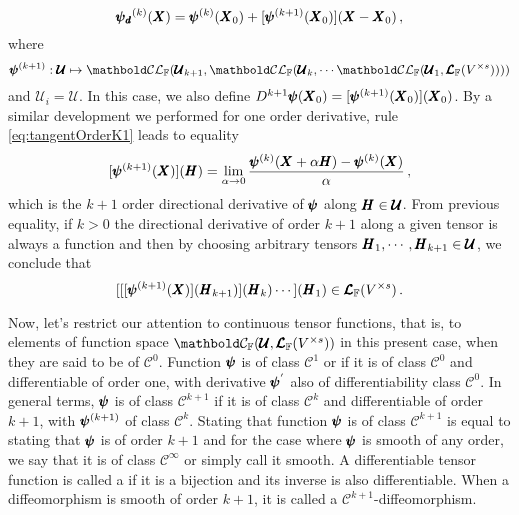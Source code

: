 \begin{equation}\label{eq:tangentOrderK1}
\pmb{\psi_\mathit{d}}^{(k)}(\pmb{X})=\pmb{\psi}^{(k)}(\pmb{X}_0)+[\pmb{\psi}^{(k+1)}(\pmb{X}_0)](\pmb{X}-\pmb{X}_0)\,,
\end{equation}
where
\begin{equation*}
\map{\tnr{\psi}^{(k+1)}}{\pmb{\mathcal{U}}}{{\evlc{\cam{F}}{\pmb{\mathcal{U}}_{k+1}}{\evlc{\cam{F}}{\pmb{\mathcal{U}}_k}{\cdots\evlc{\cam{F}}{\pmb{\mathcal{U}}_{1}}{\ete{\cam{F}}{V^{\times s}}}}}}}
\end{equation*}
and $\pmb{\mathcal{U}}_i=\pmb{\mathcal{U}}$. In this case, we also define $D^{k+1}\pmb{\psi}(\pmb{X}_0)=[\pmb{\psi}^{(k+1)}(\pmb{X}_0)](\pmb{X}_0)$. By a similar development we performed for one order derivative, rule \eqref{eq:tangentOrderK1} leads to equality
\begin{equation}\label{eq:directDerivK1}
[\pmb{\psi}^{(k+1)}(\pmb{X})](\pmb{H})=\lim_{\alpha\to 0} \dfrac{\pmb{\psi}^{(k)}(\pmb{X}+\alpha\pmb{H})-\pmb{\psi}^{(k)}(\pmb{X})}{\alpha}\,,
\end{equation}
which is the $k+1$ order directional derivative of $\pmb{\psi}$ along $\pmb{H}\in\pmb{\mathcal{U}}$. From previous equality, if $k>0$ the directional derivative of order $k+1$ along a given tensor is always a function and then by choosing arbitrary tensors $\pmb{H}_1,\cdots,\pmb{H}_{k+1}\in\pmb{\mathcal{U}}$, we conclude that
\begin{equation}\label{eq:toOrderZero}
[[[\pmb{\psi}^{(k+1)}(\pmb{X})](\pmb{H}_{k+1})](\pmb{H}_k)\cdots](\pmb{H}_{1})\in\pmb{\mathcal{L}}_{\mathbb{F}}(V^{\times s})\,.
\end{equation}

Now, let's restrict our attention to continuous tensor functions, that is, to elements of function space $\evc{\cam{F}}{\pmb{\mathcal{U}}}{\ete{\cam{F}}{V^{\times s}}}$ in this present case, when they are said to be of  $\mathcal{C}^0$. Function $\pmb{\psi}$ is of class $\mathcal{C}^1$ or  if it is of class $\mathcal{C}^0$ and differentiable of order one, with derivative $\pmb{\psi}^{'}$ also of differentiability class $\mathcal{C}^0$. In general terms, $\pmb{\psi}$ is of class $\mathcal{C}^{k+1}$ if it is of class $\mathcal{C}^{k}$ and differentiable of order $k+1$, with $\pmb{\psi}^{(k+1)}$ of class $\mathcal{C}^k$. Stating that function $\pmb{\psi}$ is of class $\mathcal{C}^{k+1}$ is equal to stating that $\pmb{\psi}$ is  of order $k+1$ and for the case where $\pmb{\psi}$ is smooth of any order, we say that it is of class $\mathcal{C}^\infty$ or simply call it smooth. A differentiable tensor function is called a  if it is a bijection and its inverse is also differentiable. When a diffeomorphism is smooth of order $k+1$, it is called a $\mathcal{C}^{k+1}$-diffeomorphism.




